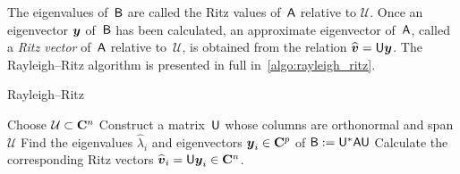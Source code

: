 The eigenvalues of~$\mathsf B$ are called the Ritz values of~$\mathsf A$ relative to $\mathcal U$.
Once an eigenvector $\mathbf{\boldsymbol{y}}$ of~$\mathsf B$ has been calculated,
an approximate eigenvector of~$\mathsf A$,
called a \emph{Ritz vector} of~$\mathsf A$ relative to~$\mathcal U$,
is obtained from the relation $\widehat {\mathbf{\boldsymbol{v}}} = \mathsf U \mathbf{\boldsymbol{y}}$.
The Rayleigh--Ritz algorithm is presented in full in~\cref{algo:rayleigh_ritz}.
\begin{algorithm}
\caption{Rayleigh--Ritz}%
\label{algo:rayleigh_ritz}%
\begin{algorithmic}
\State Choose $\mathcal U \subset \mathbf C^n$
\State Construct a matrix~$\mathsf U$ whose columns are orthonormal and span $\mathcal U$
\State Find the eigenvalues $\widehat \lambda_i$ and eigenvectors $\mathbf{\boldsymbol{y}}_i \in \mathbf C^p$ of $\mathsf B:= \mathsf U^* \mathsf A \mathsf U$
\State Calculate the corresponding Ritz vectors $\widehat {\mathbf{\boldsymbol{v}}}_i = \mathsf U \mathbf{\boldsymbol{y}}_i \in \mathbf C^n$.
\end{algorithmic}
\end{algorithm}

